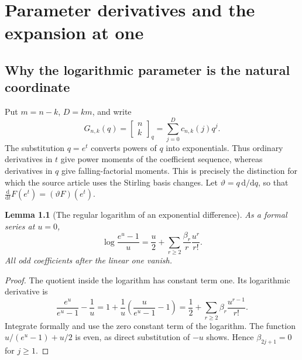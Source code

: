 \documentclass[11pt,a4paper,oneside,openany]{book}
\newtheorem{lemma}[theorem]{Lemma}
\theoremstyle{definition}
\theoremstyle{remark}
\newcommand{\GB}[3][q]{\begin{bmatrix}#2\\#3\end{bmatrix}_{#1}}
\newcommand{\logq}{\vartheta}
\begin{document}
\chapter{Parameter derivatives and the expansion at one}
\label{qcc:parameter-jets}
\section{Why the logarithmic parameter is the natural coordinate}
Put \(m=n-k\), \(D=km\), and write
\[
 G_{n,k}(q)=\GB nk=\sum_{j=0}^{D}c_{n,k}(j)q^j.
\]
The substitution \(q=e^t\) converts powers of \(q\) into exponentials. Thus
ordinary derivatives in \(t\) give power moments of the coefficient sequence,
whereas derivatives in \(q\) give falling-factorial moments. This is precisely
the distinction for which the source article uses the Stirling basis changes.
Let \(\logq=q\,\mathrm d/\mathrm dq\), so that
\(\frac{\mathrm d}{\mathrm dt}F(e^t)=(\logq F)(e^t)\).

\begin{lemma}[The regular logarithm of an exponential difference]
\label{qcc:regular-log}
As a formal series at \(u=0\),
\begin{equation}\label{qcc:regular-log-eq}
 \log\frac{e^u-1}{u}
 =\frac u2+\sum_{r\ge2}\frac{\beta_r}{r}\frac{u^r}{r!}.
\end{equation}
All odd coefficients after the linear one vanish.
\end{lemma}
\begin{proof}
The quotient inside the logarithm has constant term one. Its logarithmic
 derivative is
\[
 \frac{e^u}{e^u-1}-\frac1u
 =1+\frac1u\left(\frac{u}{e^u-1}-1\right)
 =\frac12+\sum_{r\ge2}\beta_r\frac{u^{r-1}}{r!}.
\]
Integrate formally and use the zero constant term of the logarithm. The function
\(u/(e^u-1)+u/2\) is even, as direct substitution of \(-u\) shows. Hence
\(\beta_{2j+1}=0\) for \(j\ge1\).
\end{proof}
\end{document}
